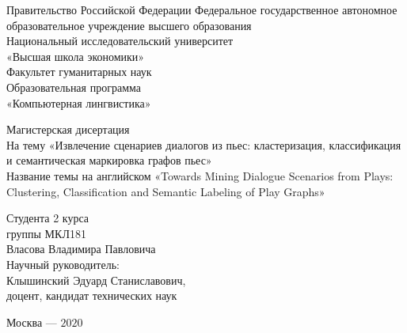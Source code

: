 \documentclass[a4paper,14pt]{article}
\begin{document}
\thispagestyle{empty}
\begin{center}
\noindent  Правительство Российской Федерации Федеральное государственное автономное образовательное учреждение высшего образования\\

Национальный исследовательский университет\\
«Высшая школа экономики»\\
Факультет гуманитарных наук\bigskip\\

Образовательная программа \\
  «Компьютерная лингвистика»\\
\vfill


Магистерская дисертация\\

На тему «Извлечение сценариев диалогов из пьес: кластеризация, классификация и семантическая маркировка графов пьес»\bigskip\\
Название темы на английском  «Towards Mining Dialogue Scenarios from Plays: Clustering, Classification and Semantic Labeling of Play Graphs»\\
\vfill
\vfill
\begin{flushright}
Студента 2 курса\\
группы МКЛ181 \\
Власова Владимира Павловича\bigskip\\
                       
Научный руководитель:\\
Клышинский Эдуард Станиславович,\\
доцент, кандидат технических наук\\
\end{flushright}
\vfill
\begin{center}
Москва --- $2020$
\end{center}

\end{center}
\pagebreak

\begin{center}
	\tableofcontents
\end{center}
\pagebreak
\end{document}

